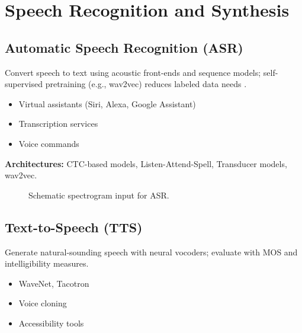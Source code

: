 
\section{Speech Recognition and Synthesis}
\label{sec:speech-applications}

\subsection{Automatic Speech Recognition (ASR)}

Convert speech to text using acoustic front-ends and sequence models; self-supervised pretraining (e.g., wav2vec) reduces labeled data needs \textcite{Prince2023}.
\begin{itemize}
    \item Virtual assistants (Siri, Alexa, Google Assistant)
    \item Transcription services
    \item Voice commands
\end{itemize}

\textbf{Architectures:} CTC-based models, Listen-Attend-Spell, Transducer models, wav2vec.

\begin{figure}[h]
  \centering
  \caption{Schematic spectrogram input for ASR.}
  \label{fig:asr-spec}
\end{figure}

\subsection{Text-to-Speech (TTS)}

Generate natural-sounding speech with neural vocoders; evaluate with MOS and intelligibility measures.
\begin{itemize}
    \item WaveNet, Tacotron
    \item Voice cloning
    \item Accessibility tools
\end{itemize}

